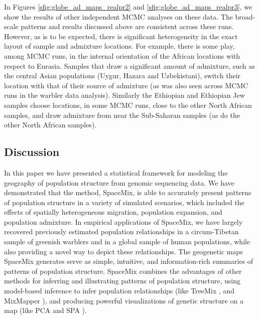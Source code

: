 \documentclass[12pt]{article}
\begin{document}
In Figures \ref{sfig:globe_ad_maps_realpr2} and \ref{sfig:globe_ad_maps_realpr3}, we show the results of other independent MCMC analyses on these data. The broad-scale patterns and results discussed above are consistent across these runs. However, as is to be expected, there is significant heterogeneity in the exact layout of sample and admixture locations. For example, there is some play, among MCMC runs, in the internal orientation of the African locations with respect to Eurasia.  Samples that draw a significant amount of admixture, such as the central Asian populations (Uygur, Hazara and Uzbekistani), switch their location with that of their source of admixture (as was also seen across MCMC runs in the warbler data analysis). Similarly the Ethiopian and Ethiopian Jew samples choose locations, in some MCMC runs, close to the other North African samples, and draw admixture from near the Sub-Saharan samples (as do the other North African samples).

\subsection*{Discussion}
In this paper we have presented a statistical framework for modeling the geography of population structure from genomic sequencing data.
We have demonstrated that the method, SpaceMix, is able to accurately present patterns of population structure in a variety of simulated scenarios, which included the effects of spatially heterogeneous migration, population expansion, and population admixture.  In empirical applications of SpaceMix, we have largely recovered previously estimated population relationships in a circum-Tibetan sample of greenish warblers and in a global sample of human populations, while also providing a novel way to depict these relationships.  The geogenetic maps SpaceMix generates serve as simple, intuitive, and information-rich summaries of patterns of population structure. 
SpaceMix combines the advantages of other methods for inferring and illustrating patterns of population structure, 
using model-based inference to infer population relationships (like TreeMix \citep{Treemix}, and MixMapper \citep{lipson_mixmapper_2013}), 
and producing powerful visualizations of genetic structure on a map (like PCA \citep{Patterson2006} and SPA \citep{yang_spatial_2014}).
\end{document}
